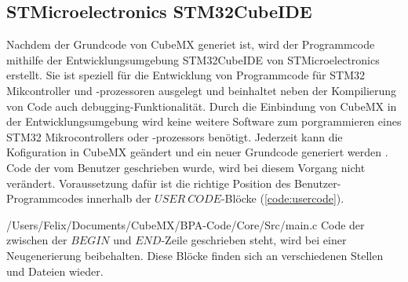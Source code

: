 
\subsection{STMicroelectronics STM32CubeIDE}
Nachdem der Grundcode von CubeMX generiet ist, wird der Programmcode mithilfe der Entwicklungsumgebung STM32CubeIDE von STMicroelectronics erstellt. Sie ist speziell für die Entwicklung von Programmcode für STM32 Mikcontroller und -prozessoren ausgelegt und beinhaltet neben der Kompilierung von Code auch debugging-Funktionalität. Durch die Einbindung von CubeMX in der Entwicklungsumgebung wird keine weitere Software zum porgrammieren eines STM32 Mikrocontrollers oder -prozessors benötigt. Jederzeit kann die Kofiguration in CubeMX geändert und ein neuer Grundcode generiert werden \cite{CubeIDE}. Code der vom Benutzer geschrieben wurde, wird bei diesem Vorgang nicht verändert. Voraussetzung dafür ist die richtige Position des Benutzer-Programmcodes innerhalb der $USER\ CODE$-Blöcke (\ref{code:usercode}).

{/Users/Felix/Documents/CubeMX/BPA-Code/Core/Src/main.c}
Code der zwischen der $BEGIN$ und $END$-Zeile geschrieben steht, wird bei einer Neugenerierung beibehalten. Diese Blöcke finden sich an verschiedenen Stellen und Dateien wieder.